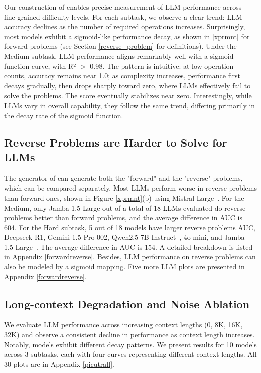 Our construction of \sysb enables precise measurement of LLM performance across fine-grained difficulty levels. For each subtask, we observe a clear trend: LLM accuracy declines as the number of required operations increases. Surprisingly, most models exhibit a sigmoid-like performance decay, as shown in \ref{xprmnt} for forward problems (see Section \ref{reverse_problem} for definitions). Under the Medium subtask, LLM performance aligns remarkably well with a sigmoid function curve, with R² $>$ 0.98. The pattern is intuitive: at low operation counts, accuracy remains near 1.0; as complexity increases, performance first decays gradually, then drops sharply toward zero, where LLMs effectively fail to solve the problems. The score eventually stabilizes near zero. Interestingly, while LLMs vary in overall capability, they follow the same trend, differing primarily in the decay rate of the sigmoid function. 

\subsection{Reverse Problems are  Harder to Solve for LLMs} 
\label{forwardreverseeval} 

The generator of \sysb can generate both the "forward" and the "reverse" problems, which can be compared separately. Most LLMs perform worse in reverse problems than forward ones, shown in Figure \ref{xprmnt}(b) using Mistral-Large~\citep{jiang2023mistral}. For the Medium, only Jamba-1.5-Large out of a total of 18 LLMs evaluated do reverse problems better than forward problems, and the average difference in AUC is 604. 
For the Hard subtask, 5 out of 18 models have larger reverse problems AUC, Deepseek R1, Gemini-1.5-Pro-002, Qwen2.5-7B-Instruct~\cite{qwen2025qwen25technicalreport}, 4o-mini, and Jamba-1.5-Large~\citep{team2024jamba}. 
The average difference in AUC is 154. A detailed breakdown is listed in Appendix \ref{forwardreverse}. Besides, LLM performance on reverse problems can also be modeled by a sigmoid mapping.  Five more LLM plots are presented in Appendix \ref{forwardreverse}. 

\subsection{Long-context Degradation and Noise Ablation} 
\label{longdegradation} 
We evaluate LLM performance across increasing context lengths (0, 8K, 16K, 32K) and observe a consistent decline in performance as context length increases. Notably, models exhibit different decay patterns. 
We present results for 10 models across 3 subtasks, each with four curves representing different context lengths. All 30 plots are in Appendix \ref{picutrall}.


